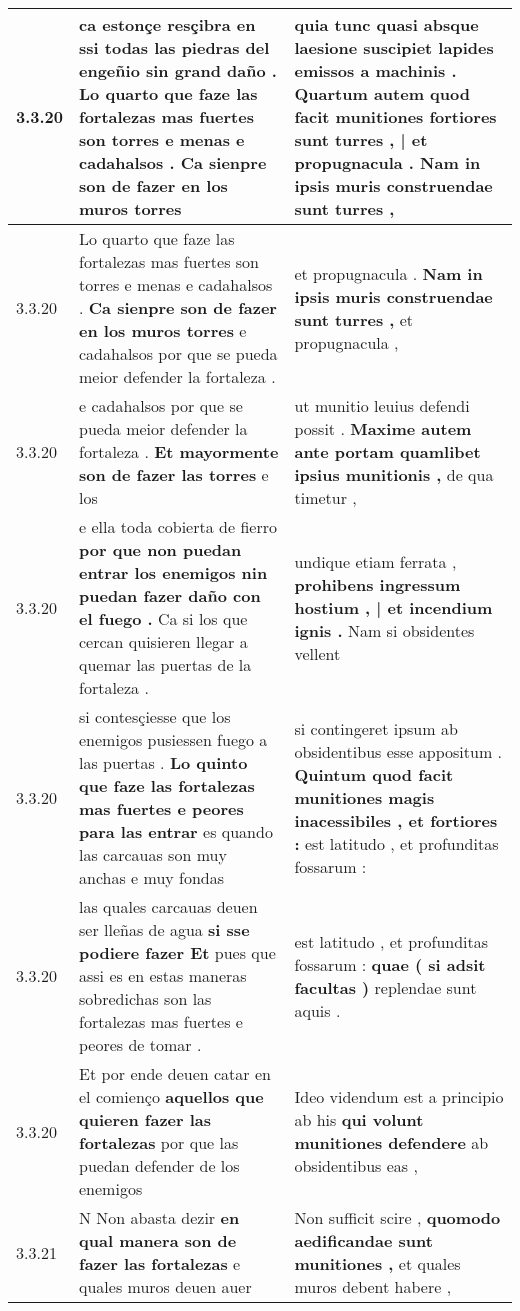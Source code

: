 \begin{tabular}{|p{1cm}|p{6.5cm}|p{6.5cm}|}
3.3.20 & ca estonçe resçibra en ssi todas las piedras del engeñio sin grand daño . \textbf{ Lo quarto que faze las fortalezas mas fuertes son torres e menas e cadahalsos . } Ca sienpre son de fazer en los muros torres & quia tunc quasi absque laesione suscipiet lapides emissos a machinis . \textbf{ Quartum autem quod facit munitiones fortiores sunt turres , | et propugnacula . } Nam in ipsis muris construendae sunt turres , \\\hline
3.3.20 & Lo quarto que faze las fortalezas mas fuertes son torres e menas e cadahalsos . \textbf{ Ca sienpre son de fazer en los muros torres } e cadahalsos por que se pueda meior defender la fortaleza . & et propugnacula . \textbf{ Nam in ipsis muris construendae sunt turres , } et propugnacula , \\\hline
3.3.20 & e cadahalsos por que se pueda meior defender la fortaleza . \textbf{ Et mayormente son de fazer las torres } e los & ut munitio leuius defendi possit . \textbf{ Maxime autem ante portam quamlibet ipsius munitionis , } de qua timetur , \\\hline
3.3.20 & e ella toda cobierta de fierro \textbf{ por que non puedan entrar los enemigos nin puedan fazer daño con el fuego . } Ca si los que cercan quisieren llegar a quemar las puertas de la fortaleza . & undique etiam ferrata , \textbf{ prohibens ingressum hostium , | et incendium ignis . } Nam si obsidentes vellent \\\hline
3.3.20 & si contesçiesse que los enemigos pusiessen fuego a las puertas . \textbf{ Lo quinto que faze las fortalezas mas fuertes e peores para las entrar } es quando las carcauas son muy anchas e muy fondas & si contingeret ipsum ab obsidentibus esse appositum . \textbf{ Quintum quod facit munitiones magis inacessibiles , et fortiores : } est latitudo , et profunditas fossarum : \\\hline
3.3.20 & las quales carcauas deuen ser lleñas de agua \textbf{ si sse podiere fazer Et } pues que assi es en estas maneras sobredichas son las fortalezas mas fuertes e peores de tomar . & est latitudo , et profunditas fossarum : \textbf{ quae ( si adsit facultas ) } replendae sunt aquis . \\\hline
3.3.20 & Et por ende deuen catar en el comienço \textbf{ aquellos que quieren fazer las fortalezas } por que las puedan defender de los enemigos & Ideo videndum est a principio ab his \textbf{ qui volunt munitiones defendere } ab obsidentibus eas , \\\hline
3.3.21 & N Non abasta dezir \textbf{ en qual manera son de fazer las fortalezas } e quales muros deuen auer & Non sufficit scire , \textbf{ quomodo aedificandae sunt munitiones , } et quales muros debent habere , \\\hline

\end{tabular}
